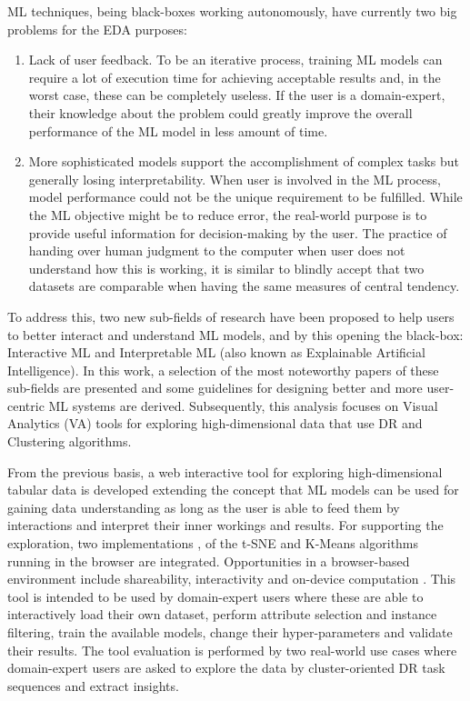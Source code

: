 
ML techniques, being black-boxes working autonomously, have currently two big problems for the EDA purposes: 

\begin{enumerate}
\item Lack of user feedback. To be an iterative process, training ML models can require a lot of execution time for achieving acceptable results and, in the worst case, these can be completely useless. If the user is a domain-expert, their knowledge about the problem could greatly improve the overall performance of the ML model in less amount of time.
\item More sophisticated models support the accomplishment of complex tasks but generally losing interpretability. When user is involved in the ML process, model performance could not be the unique requirement to be fulfilled. While the ML objective might be to reduce error, the real-world purpose is to provide useful information \cite{Lipton2017} for decision-making by the user. The practice of handing over human judgment to the computer when user does not understand how this is working, it is similar to blindly accept that two datasets are comparable when having the same measures of central tendency.
\end{enumerate}

To address this, two new sub-fields of research have been proposed to help users to better interact and understand ML models, and by this opening the black-box: Interactive ML and Interpretable ML (also known as Explainable Artificial Intelligence). In this work, a selection of the most noteworthy papers of these sub-fields are presented and some guidelines for designing better and more user-centric ML systems are derived. Subsequently, this analysis focuses on Visual Analytics (VA) tools for exploring high-dimensional data that use DR and Clustering algorithms.

From the previous basis, a web interactive tool for exploring high-dimensional tabular data is developed extending the concept that ML models can be used for gaining data understanding as long as the user is able to feed them by interactions and interpret their inner workings and results. For supporting the exploration, two implementations \cite{Pezzotti2018LinearWeb},\cite{Asensio2018Ml-kmeans} of the t-SNE and K-Means algorithms running in the browser are integrated. Opportunities in a browser-based environment include shareability, interactivity and on-device computation \cite{Smilkov2019TensorFlow.js:Beyond}. This tool is intended to be used by domain-expert users where these are able to interactively load their own dataset, perform attribute selection and instance filtering, train the available models, change their hyper-parameters and validate their results. The tool evaluation is performed by two real-world use cases where domain-expert users are asked to explore the data by cluster-oriented DR task sequences \cite{Brehmer2014VisualizingSequences} and extract insights.

